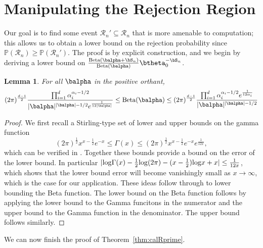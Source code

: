 \documentclass[11pt]{article}
\def\log{{\rm log}}
\newcommand{\Beta}{\mathrm{Beta}}
\newtheorem{lemma}{Lemma}[section]
\begin{document}
\section{Manipulating the Rejection Region}
\label{sec:rejection_region}
Our goal is to find some event $\mathcal R_n'\subseteq \mathcal R_n$ that is more amenable to computation; this allows us to obtain a lower bound on the rejection probability since
$\mathbb{P}(\mathcal R_n) \geq \mathbb{P}(\mathcal R_n')$.
The proof is by explicit construction, and we begin by deriving a lower bound on 
$
 \frac{\Beta(\balpha + \bS_n)} {\Beta(\balpha)} \btheta_0 ^{-\bS_n}
$.
\begin{lemma}\label{lem:beta.lower.bound}
  For all $\balpha$ in the positive orthant,
  \begin{equation*}
    (2\pi)^{\frac{d-1}{2}}
    \frac{\prod_{i=1}^d \alpha_i^{\alpha_i - 1/2}}{|\balpha|^{|\balpha|-1/2}e^{\frac{1}{12|\balpha|}}} \leq  \Beta(\balpha) \leq 
(2\pi)^{\frac{d-1}{2}}
    \frac{\prod_{i=1}^d \alpha_i^{\alpha_i - 1/2}e^{\frac{1}{12\alpha_i}}}{|\balpha|^{|\balpha|-1/2}} 
  \end{equation*}
\end{lemma}
\begin{proof}
  We first recall a Stirling-type set of lower and upper bounds on the gamma function
\begin{equation}
(2\pi)^{\frac{1}{2}}x^{x-\frac{1}{2}}e^{-x}
  \leq \Gamma(x) \leq (2\pi)^{\frac{1}{2}}x^{x-\frac{1}{2}}e^{-x}e^{\frac{1}{12x}},
\end{equation}
which can be verified in \cite{specialfunctions}.
Together these bounds provide a bound on the error of the lower bound.
In particular $|\log \Gamma(x) - \frac{1}{2}\log (2\pi) - (x-\frac{1}{2})\log x + x| \leq \frac{1}{12x}$, which shows
that the lower bound error will become vanishingly small as $x\rightarrow \infty$, which is the case for our application. 
These ideas follow through to lower bounding the Beta function. The lower bound on the Beta function follows by applying the lower bound to the Gamma funcitons
in the numerator and the upper bound to the Gamma function in the denominator. The upper bound follows similarly.
\end{proof}
\noindent We can now finish the proof of Theorem~\ref{thm:calRprime}.
\end{document}
